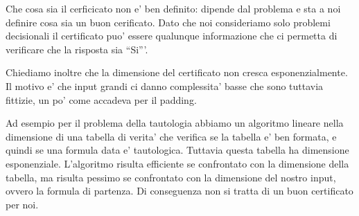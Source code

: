 Che cosa sia il cerficicato non e' ben definito: dipende dal problema e sta a noi definire cosa sia
un buon cerificato. Dato che noi consideriamo solo problemi decisionali il certificato puo' essere
qualunque informazione che ci permetta di verificare che la risposta sia ``Si'''.

Chiediamo inoltre che la dimensione del certificato non cresca esponenzialmente. Il motivo e' che
input grandi ci danno complessita' basse che sono tuttavia fittizie, un po' come accadeva per il
padding.

Ad esempio per il problema della tautologia abbiamo un algoritmo lineare nella dimensione di una
tabella di verita' che verifica se la tabella e' ben formata, e quindi se una formula data e'
tautologica. Tuttavia questa tabella ha dimensione esponenziale. L'algoritmo risulta efficiente se
confrontato con la dimensione della tabella, ma risulta pessimo se confrontato con la dimensione del
nostro input, ovvero la formula di partenza. Di conseguenza non si tratta di un buon certificato per
noi.

